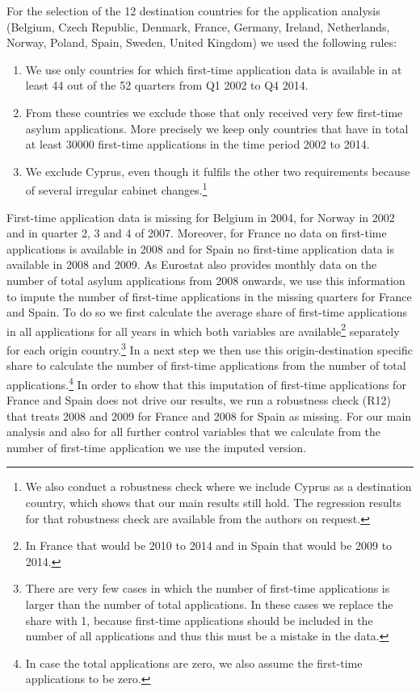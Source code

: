 \documentclass[11pt,a4paper]{scrartcl}
\begin{document}
For the selection of the 12 destination countries for the application analysis (Belgium, Czech Republic, Denmark, France, Germany, Ireland, Netherlands, Norway, Poland, Spain, Sweden, United Kingdom) we used the following rules:
\begin{enumerate}
	\itemsep-0.2em
	\item We use only countries for which first-time application data is available in at least 44 out of the 52 quarters from Q1 2002 to Q4 2014.
	\item From these countries we exclude those that only received very few first-time asylum applications. More precisely we keep only countries that have in total at least 30000 first-time applications in the time period 2002 to 2014.
	\item We exclude Cyprus, even though it fulfils the other two requirements because of several irregular cabinet changes.\footnote{We also conduct a robustness check where we include Cyprus as a destination country, which shows that our main results still hold. The regression results for that robustness check are available from the authors on request.}
\end{enumerate}   

First-time application data is missing for Belgium in 2004, for Norway in 2002 and in quarter 2, 3 and 4 of 2007. Moreover, for France no data on first-time applications is available in 2008 and for Spain no first-time application data is available in 2008 and 2009. As Eurostat also provides monthly data on the number of total asylum applications from 2008 onwards, we use this information to impute the number of first-time applications in the missing quarters for France and Spain. To do so we first calculate the average share of first-time applications in all applications for all years in which both variables are available\footnote{In France that would be 2010 to 2014 and in Spain that would be 2009 to 2014.} separately for each origin country.\footnote{There are very few cases in which the number of first-time applications is larger than the number of total applications. In these cases we replace the share with 1, because first-time applications should be included in the number of all applications and thus this must be a mistake in the data.} In a next step we then use this origin-destination specific share to calculate the number of first-time applications from the number of total applications.\footnote{In case the total applications are zero, we also assume the first-time applications to be zero.} In order to show that this imputation of first-time applications for France and Spain does not drive our results, we run a robustness check (R12) that treats 2008 and 2009 for France and 2008 for Spain as missing. For our main analysis and also for all further control variables that we calculate from the number of first-time application we use the imputed version.
\end{document}
